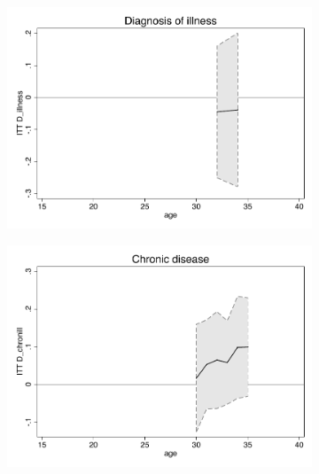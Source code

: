 \documentclass[a4paper ]{article}
\begin{document}
\begin{figure}[p]
\begin{subfigure}[h]{0.48\textwidth}\centering
	\includegraphics[width=\textwidth]{../../analysis/graphs/SOEP/D_illness_LC.pdf}
\end{subfigure}
\quad
\begin{subfigure}[h]{0.48\textwidth}\centering
	\includegraphics[width=\textwidth]{../../analysis/graphs/SOEP/D_chronill_LC.pdf}
\end{subfigure}


\end{figure}
\end{document}
